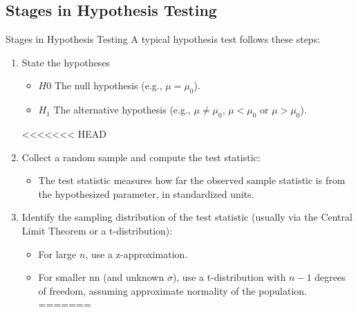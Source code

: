 \documentclass[10pt]{extarticle}
\begin{document}
\subsection{Stages in Hypothesis Testing}
\begin{conceptbox}{Stages in Hypothesis Testing}{}
    A typical hypothesis test follows these steps:
    \begin{enumerate}
        \item State the hypotheses
        \begin{itemize}
            \item $H0$ The null hypothesis (e.g., $\mu = \mu_0$).
            \item $H_1$ The alternative hypothesis (e.g., $\mu \neq \mu_0$, $\mu < \mu_0$ or $\mu > \mu_0$).
        \end{itemize}
<<<<<<< HEAD
    \item  Collect a random sample and compute the test statistic:
        \begin{itemize}
            \item The test statistic measures how far the observed sample statistic is from the hypothesized parameter, in standardized units.
        \end{itemize}
    \item Identify the sampling distribution of the test statistic (usually via the Central Limit Theorem or a t-distribution):
    \begin{itemize}
        \item For large $n$, use a z-approximation.
        \item For smaller nn (and unknown $\sigma$), use a t-distribution with $n-1$ degrees of freedom, assuming approximate normality of the population.
=======
 

\end{itemize}
\end{enumerate}
\end{conceptbox}
\end{document}
